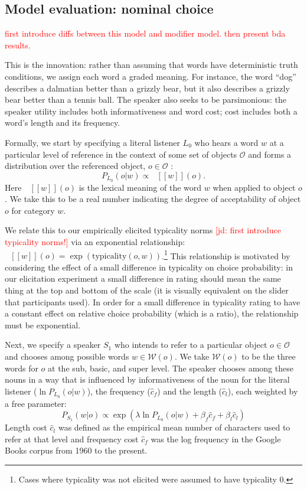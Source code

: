 \documentclass[11pt]{article}
\newcommand{\red}[1]{\textcolor{Red}{#1}}
\newcommand{\jd}[1]{\textcolor{Red}{[jd: #1]}}
\newcommand{\denote}[1]{\mbox{ $[\![ #1 ]\!]$}}
\begin{document}
\subsection{Model evaluation: nominal choice}
\label{sec:reflevelmodel}

\red{first introduce diffs between this model and modifier model. then present bda results.}

This is the innovation: rather than assuming that words have deterministic truth conditions, we assign each word a graded meaning. For instance, the word ``dog'' describes a dalmatian better than a grizzly bear, but it also describes a grizzly bear better than a tennis ball.
The speaker also seeks to be parsimonious: the speaker utility includes both informativeness and word cost; cost includes both a word's length and its frequency.

Formally, we start by specifying a literal listener $L_0$ who hears a word $w$ at a particular level of reference  in the context of some set of objects $\mathcal{O}$ and forms a distribution over the referenced object, $o \in \mathcal{O}$ : 
$$P_{L_0}(o | w) \propto \denote{w}(o).$$
Here $\denote{w}(o)$ is the lexical meaning of the word $w$ when applied to object $o$. We take this to be a real number indicating the degree of acceptability of object $o$ for category $w$. 

We relate this to our empirically elicited typicality norms \jd{first introduce typicality norms!} via an exponential relationship: $\denote{w}(o)=\exp(\text{typicality}(o,w))$.\footnote{Cases where typicality was not elicited were assumed to have typicality $0$.}
This relationship is motivated by considering the effect of a small difference in typicality on choice probability: in our elicitation experiment a small difference in rating should mean the same thing at the top and bottom of the scale (it is visually equivalent on the slider that participants used).
In order for a small difference in typicality rating to have a constant effect on relative choice probability (which is a ratio), the relationship must be exponential. 

Next, we specify a speaker $S_1$ who intends to refer to a particular object $o \in \mathcal{O}$ and chooses among possible words $w \in {\mathcal W}(o)$.
We take ${\mathcal W}(o)$ to be the three words for $o$ at the sub, basic, and super level.
The speaker chooses among these nouns in a way that is influenced by informativeness of the noun for the literal listener ($\ln P_{L_0}(o | w)$), the frequency ($\hat{c}_f$) and the length  ($\hat{c}_l$), each weighted by a free parameter:
$$P_{S_1}(w | o) \propto \exp(\lambda \ln P_{L_0}(o | w) + \beta_f \hat{c}_f  + \beta_l \hat{c}_l)$$
Length cost $\hat{c}_l$ was defined as the empirical mean number of characters used to refer at that level and frequency cost $\hat{c}_f$ was the log frequency in the Google Books corpus from 1960 to the present. 
\end{document}
